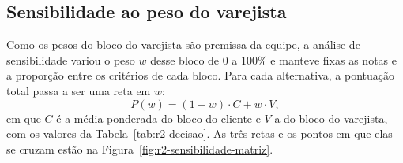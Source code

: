 \subsection{Sensibilidade ao peso do varejista}

Como os pesos do bloco do varejista são premissa da equipe, a análise de sensibilidade variou o peso $w$ desse bloco de 0 a 100\% e manteve fixas as notas e a proporção entre os critérios de cada bloco. Para cada alternativa, a pontuação total passa a ser uma reta em $w$:
\begin{equation}
P(w) = (1 - w) \cdot C + w \cdot V,
\end{equation}
em que $C$ é a média ponderada do bloco do cliente e $V$ a do bloco do varejista, com os valores da Tabela~\ref{tab:r2-decisao}. As três retas e os pontos em que elas se cruzam estão na Figura~\ref{fig:r2-sensibilidade-matriz}.

